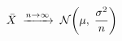 \documentclass[preview]{standalone}
\begin{document}
\begin{align*}
\special{dvisvgm:raw <g id='unique000'>}\bar{X} \;\xrightarrow{n\to\infty}\; \mathcal{N}\!\left(\mu,\;\frac{\sigma^2}{n}\right)\special{dvisvgm:raw </g>}
\end{align*}
\end{document}
